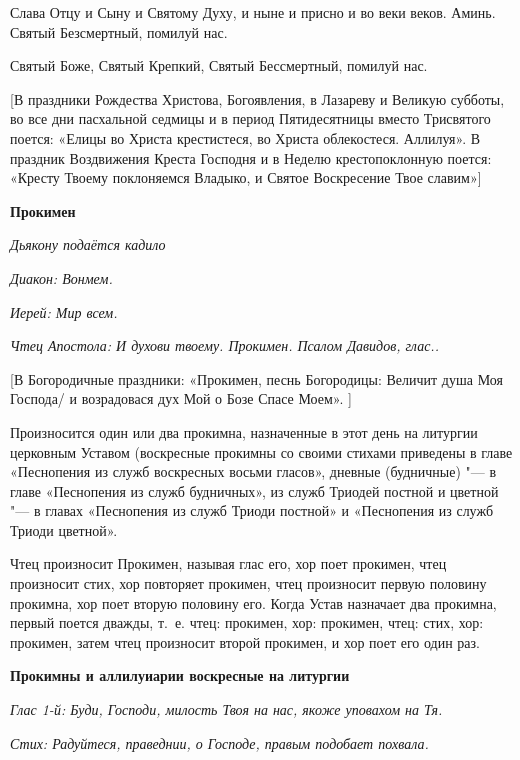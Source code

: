 Слава Отцу и Сыну и Святому Духу, и ныне и присно и во веки веков. Аминь. Святый Безсмертный, помилуй нас.


Святый Боже, Святый Крепкий, Святый Бессмертный, помилуй нас.


[В праздники Рождества Христова, Богоявления, в Лазареву и Великую субботы, во все дни пасхальной седмицы и в период Пятидесятницы вместо Трисвятого поется: «Елицы во Христа крестистеся, во Христа облекостеся. Аллилуя». В праздник Воздвижения Креста Господня и в Неделю крестопоклонную поется: «Кресту Твоему поклоняемся Владыко, и Святое Воскресение Твое славим»]




\medskip


\bfseries Прокимен \normalfont{}\nopagebreak


\itshape Дьякону подаётся кадило\normalfont{}


\itshape Диакон:\normalfont{} Вонмем.


\itshape Иерей:\normalfont{} Мир всем.


\itshape Чтец Апостола:\normalfont{} И духови твоему. Прокимен. Псалом Давидов, глас..




[В Богородичные праздники: «Прокимен, песнь Богородицы: Величит душа Моя Господа/ и возрадовася дух Мой о Бозе Спасе Моем». ]


Произносится один или два прокимна, назначенные в этот день на литургии церковным Уставом (воскресные прокимны со своими стихами приведены в главе «Песнопения из служб воскресных восьми гласов», дневные (будничные) "--- в главе «Песнопения из служб будничных», из служб Триодей постной и цветной "--- в главах «Песнопения из служб Триоди постной» и «Песнопения из служб Триоди цветной».


Чтец произносит Прокимен, называя глас его, хор поет прокимен, чтец произносит стих, хор повторяет прокимен, чтец произносит первую половину прокимна, хор поет вторую половину его. Когда Устав назначает два прокимна, первый поется дважды, т.~е. чтец: прокимен, хор: прокимен, чтец: стих, хор: прокимен, затем чтец произносит второй прокимен, и хор поет его один раз.


\medskip
\bfseries Прокимны и аллилуиарии воскресные на литургии\normalfont{}\nopagebreak


\itshape Глас 1-й:\normalfont{} Буди, Господи, милость Твоя на нас, якоже уповахом на Тя.


\itshape Стих:\normalfont{} Радуйтеся, праведнии, о Господе, правым подобает похвала.


